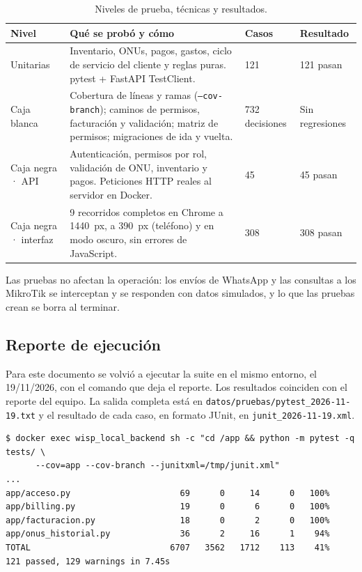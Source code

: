 \begin{table}[H]
\centering
\caption{Niveles de prueba, técnicas y resultados.}
\label{tab:ce02-e4-niveles}
\small
\begin{tabularx}{\textwidth}{L{2.6cm}XC{1.6cm}C{1.8cm}}
\toprule
\textbf{Nivel} & \textbf{Qué se probó y cómo} & \textbf{Casos} & \textbf{Resultado} \\
\midrule
Unitarias & Inventario, ONUs, pagos, gastos, ciclo de servicio del cliente y reglas puras. pytest + FastAPI TestClient. & 121 & 121 pasan \\
Caja blanca & Cobertura de líneas y ramas (\texttt{--cov-branch}); caminos de permisos, facturación y validación; matriz de permisos; migraciones de ida y vuelta. & 732 decisiones & Sin regresiones \\
Caja negra · API & Autenticación, permisos por rol, validación de ONU, inventario y pagos. Peticiones HTTP reales al servidor en Docker. & 45 & 45 pasan \\
Caja negra · interfaz & 9 recorridos completos en Chrome a 1440~px, a 390~px (teléfono) y en modo oscuro, sin errores de JavaScript. & 308 & 308 pasan \\
\bottomrule
\end{tabularx}
\end{table}

Las pruebas no afectan la operación: los envíos de WhatsApp y las consultas a los MikroTik se
interceptan y se responden con datos simulados, y lo que las pruebas crean se borra al
terminar.

\subsection{Reporte de ejecución}

Para este documento se volvió a ejecutar la suite en el mismo entorno, el 19/11/2026, con el
comando que deja el reporte. Los resultados coinciden con el reporte del equipo. La salida
completa está en \texttt{datos/pruebas/pytest\_2026-11-19.txt} y el resultado de cada caso,
en formato JUnit, en \texttt{junit\_2026-11-19.xml}.

\begin{lstlisting}[style=plano]
$ docker exec wisp_local_backend sh -c "cd /app && python -m pytest -q tests/ \
      --cov=app --cov-branch --junitxml=/tmp/junit.xml"
...
app/acceso.py                      69      0     14      0   100%
app/billing.py                     19      0      6      0   100%
app/facturacion.py                 18      0      2      0   100%
app/onus_historial.py              36      2     16      1    94%
TOTAL                            6707   3562   1712    113    41%
121 passed, 129 warnings in 7.45s
\end{lstlisting}

